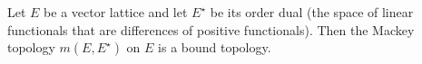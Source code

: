 Let $E$ be a vector lattice and let $E^\star$ be its order dual (the space of linear functionals that are differences of positive functionals). Then the Mackey topology $m(E, E^\star)$ on $E$ is a bound topology.
